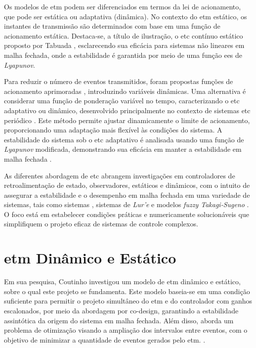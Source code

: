 Os modelos de \acrshort{etm} podem ser diferenciados em termos da lei de acionamento, que pode ser estática ou adaptativa (dinâmica). No contexto do \acrshort{etm} estático, os instantes de transmissão são determinados com base em uma função de acionamento estática. Destaca-se, a título de ilustração, o \acrshort{etc} contínuo estático proposto por Tabuada \cite{Tabuada2007}, esclarecendo sua eficácia para sistemas não lineares em malha fechada, onde a estabilidade é garantida por meio de uma função \acrfull{ees} de \textit{Lyapunov}.

Para reduzir o número de eventos transmitidos, foram propostas funções de acionamento aprimoradas \cite{Wang2020,Zong2023,Ge2017, Ning2018, Wu2021}, introduzindo variáveis dinâmicas. Uma alternativa é considerar uma função de ponderação variável no tempo, caracterizando o \acrshort{etc} adaptativo ou dinâmico, desenvolvido principalmente no contexto de sistemas \acrshort{etc} periódico \cite{coutinho2021}. Este método permite ajustar dinamicamente o limite de acionamento, proporcionando uma adaptação mais flexível às condições do sistema. A estabilidade do sistema sob o \acrshort{etc} adaptativo é analisada usando uma função de \textit{Lyapunov} modificada, demonstrando sua eficácia em manter a estabilidade em malha fechada \cite{coutinho2021}.

As diferentes abordagem de \acrshort{etc} abrangem investigações em controladores de retroalimentação de estado, observadores,  estáticos e dinâmicos, com o intuito de assegurar a estabilidade e o desempenho em malha fechada em uma variedade de sistemas, tais como sistemas  \cite{Zong2023,Wu2021}, sistemas de \textit{Lur'e} \cite{Zhang2017} e modelos \textit{fuzzy Takagi-Sugeno} \cite{Pan2017}. O foco está em estabelecer condições práticas e numericamente solucionáveis que simplifiquem o projeto eficaz de sistemas de controle complexos.

\section{\acrshort{etm} Dinâmico e Estático}

Em sua pesquisa, Coutinho investigou um modelo de \acrshort{etm} dinâmico e estático, sobre o qual este projeto se fundamenta. Este modelo baseia-se em uma condição suficiente para permitir o projeto simultâneo do \acrshort{etm} e do controlador com ganhos escalonados, por meio da abordagem por co-design, garantindo a estabilidade assintótica da origem do sistema em malha fechada. Além disso, aborda um problema de otimização visando a ampliação dos intervalos entre eventos, com o objetivo de minimizar a quantidade de eventos gerados pelo \acrshort{etm}. \cite{coutinho2021}.

